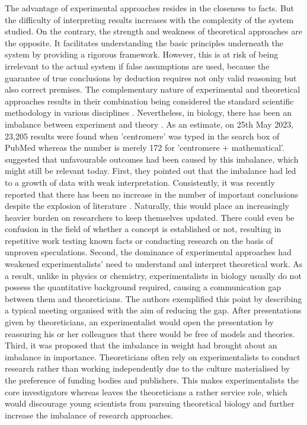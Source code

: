 The advantage of experimental approaches resides in the closeness to facts. But the difficulty of interpreting results increases with the complexity of the system studied. On the contrary, the strength and weakness of theoretical approaches are the opposite. It facilitates understanding the basic principles underneath the system by providing a rigorous framework. However, this is at risk of being irrelevant to the actual system if false assumptions are used, because the guarantee of true conclusions by deduction requires not only valid reasoning but also correct premises. The complementary nature of experimental and theoretical approaches results in their combination being considered the standard scientific methodology in various disciplines \citep{Platt1964StrongInference}. Nevertheless, in biology, there has been an imbalance between experiment and theory \citep{Fidelman1985TheModeling}. As an estimate, on 25th May 2023, 23,205 results were found when 'centromere' was typed in the search box of PubMed whereas the number is merely 172 for 'centromere + mathematical'. \cite{Fidelman1985TheModeling} suggested that unfavourable outcomes had been caused by this imbalance, which might still be relevant today. First, they pointed out that the imbalance had led to a growth of data with weak interpretation. Consistently, it was recently reported that there has been no increase in the number of important conclusions despite the explosion of literature \citep{Park2023PapersTime, Nurse2021BiologyData}. Naturally, this would place an increasingly heavier burden on researchers to keep themselves updated. There could even be confusion in the field of whether a concept is established or not, resulting in repetitive work testing known facts or conducting research on the basis of unproven speculations. Second, the dominance of experimental approaches had weakened experimentalists' need to understand and interpret theoretical work. As a result, unlike in physics or chemistry, experimentalists in biology usually do not possess the quantitative background required, causing a communication gap between them and theoreticians. The authors exemplified this point by describing a typical meeting organised with the aim of reducing the gap. After presentations given by theoreticians, an experimentalist would open the presentation by reassuring his or her colleagues that there would be free of models and theories. Third, it was proposed that the imbalance in weight had brought about an imbalance in importance. Theoreticians often rely on experimentalists to conduct research rather than working independently due to the culture materialised by the preference of funding bodies and publishers. This makes experimentalists the core investigators whereas leaves the theoreticians a rather service role, which would discourage young scientists from pursuing theoretical biology and further increase the imbalance of research approaches. 

